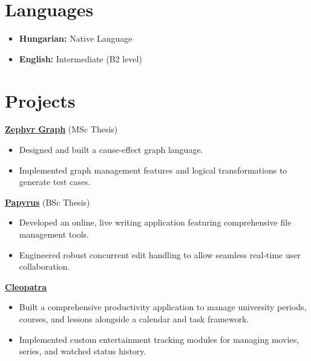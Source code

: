 \documentclass[11pt,a4paper]{article}
\begin{document}
\section{Languages}
\begin{itemize}[leftmargin=0pt, label={}]
    \item \textbf{Hungarian:} Native Language
    \item \textbf{English:} Intermediate (B2 level)
\end{itemize}

\section{Projects}
\textbf{\href{https://github.com/karcagtamas/ZephyrGraph}{Zephyr Graph}} (MSc Thesis)
\begin{itemize}[noitemsep,topsep=2pt,leftmargin=0.15in]
    \item Designed and built a cause-effect graph language.
    \item Implemented graph management features and logical transformations to generate test cases.
\end{itemize}

\vspace{4pt}
\textbf{\href{https://github.com/karcagtamas/Papyrus}{Papyrus}} (BSc Thesis)
\begin{itemize}[noitemsep,topsep=2pt,leftmargin=0.15in]
    \item Developed an online, live writing application featuring comprehensive file management tools.
    \item Engineered robust concurrent edit handling to allow seamless real-time user collaboration.
\end{itemize}

\vspace{4pt}
\textbf{\href{https://karcags.eu:9800}{Cleopatra}}
\begin{itemize}[noitemsep,topsep=2pt,leftmargin=0.15in]
    \item Built a comprehensive productivity application to manage university periods, courses, and lessons alongside a calendar and task framework.
    \item Implemented custom entertainment tracking modules for managing movies, series, and watched status history.
\end{itemize}
\end{document}
